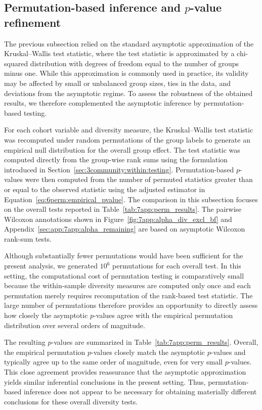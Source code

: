 \subsection{Permutation-based inference and $p$-value refinement}
\label{sec:7app:alpha:permutation}

The previous subsection relied on the standard asymptotic approximation of the Kruskal--Wallis test statistic, where the test statistic is approximated by a chi-squared distribution with degrees of freedom equal to the number of groups minus one. While this approximation is commonly used in practice, its validity may be affected by small or unbalanced group sizes, ties in the data, and deviations from the asymptotic regime. To assess the robustness of the obtained results, we therefore complemented the asymptotic inference by permutation-based testing.

For each cohort variable and diversity measure, the Kruskal--Wallis test statistic was recomputed under random permutations of the group labels to generate an empirical null distribution for the overall group effect. The test statistic was computed directly from the group-wise rank sums using the formulation introduced in Section~\ref{sec:3community:within:testing}. Permutation-based $p$-values were then computed from the number of permuted statistics greater than or equal to the observed statistic using the adjusted estimator in Equation~\eqref{eq:6perm:empirical_pvalue}. The comparison in this subsection focuses on the overall tests reported in Table~\ref{tab:7app:perm_results}. The pairwise Wilcoxon annotations shown in Figure~\ref{fig:7app:alpha_div_excl_bf} and Appendix~\ref{sec:app:7app:alpha_remaining} are based on asymptotic Wilcoxon rank-sum tests.

Although substantially fewer permutations would have been sufficient for the present analysis, we generated $10^6$ permutations for each overall test. In this setting, the computational cost of permutation testing is comparatively small because the within-sample diversity measures are computed only once and each permutation merely requires recomputation of the rank-based test statistic. The large number of permutations therefore provides an opportunity to directly assess how closely the asymptotic $p$-values agree with the empirical permutation distribution over several orders of magnitude.

The resulting $p$-values are summarized in Table~\ref{tab:7app:perm_results}. Overall, the empirical permutation $p$-values closely match the asymptotic $p$-values and typically agree up to the same order of magnitude, even for very small $p$-values. This close agreement provides reassurance that the asymptotic approximation yields similar inferential conclusions in the present setting. Thus, permutation-based inference does not appear to be necessary for obtaining materially different conclusions for these overall diversity tests.

